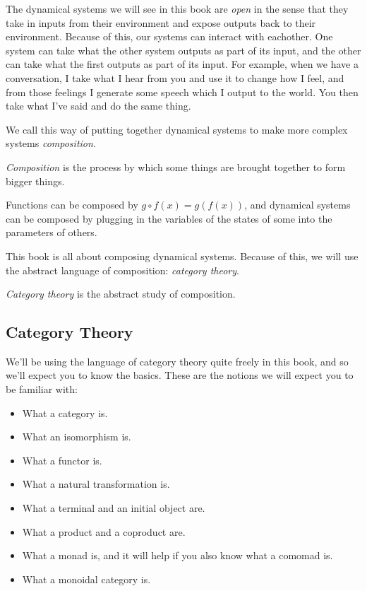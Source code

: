 \documentclass[DynamicalBook]{subfiles}
\begin{document}
The dynamical systems we will see in this book are \emph{open} in the sense that
they take in inputs from their environment and expose outputs back to their
environment. Because of this, our systems can interact with eachother. One
system can take what the other system outputs as part of its input, and the
other can take what the first outputs as part of its input. For example, when we
have a conversation, I take what I hear from you and use it to change how I
feel, and from those feelings I generate some speech which I output to the
world. You then take what I've said and do the same thing.

\begin{center}
\end{center}

We call this way of putting together dynamical systems to make more complex
systems \emph{composition}.
\begin{informal}
  \emph{Composition} is the process by which some things are brought together to
  form bigger things.
\end{informal}

Functions can be composed by $g \circ f(x) = g(f(x))$, and dynamical systems
can be composed by plugging in the variables of the states of some into the
parameters of others.
  
This book is all about composing dynamical systems. Because of this, we will use
the abstract language of composition: \emph{category theory}.
\begin{informal}
\emph{Category theory} is the abstract study of composition.
\end{informal}




\subsection{Category Theory}

We'll be using the language of category theory quite freely in this book, and so
we'll expect you to know the basics. These are the notions we will expect you to
be familiar with:
\begin{itemize}
\item What a category is.
\item What an isomorphism is.
\item What a functor is.
\item What a natural transformation is.
\item What a terminal and an initial object are.
\item What a product and a coproduct are.
\item What a monad is, and it will help if you also know what a comomad is.
  \item What a monoidal category is.
\end{itemize}
\end{document}
